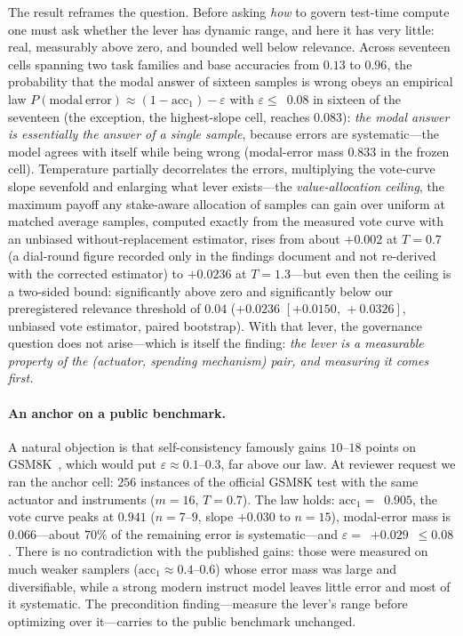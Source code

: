 \documentclass{article}
\newcommand{\LLMtecho}{$+0.0236$} \newcommand{\LLMtechoIC}{$[+0.0150,\,+0.0326]$}
\newcommand{\LLMtechoTbaja}{$+0.002$}
\newcommand{\LLMmodalerr}{$0.833$}
\newcommand{\LLMepsilon}{$0.08$}
\newcommand{\GsmAccUno}{$0.905$} \newcommand{\GsmPend}{$+0.030$}
\newcommand{\GsmModalErr}{$0.066$} \newcommand{\GsmEps}{$+0.029$}
\begin{document}
The result reframes the question. Before asking \emph{how} to govern
test-time compute one must ask whether the lever has dynamic range, and here
it has very little: real, measurably above zero, and bounded well below
relevance. Across seventeen cells spanning two task families and base
accuracies from $0.13$ to $0.96$, the probability that the modal answer of
sixteen samples is wrong obeys an empirical law
$P(\mathrm{modal\ error}) \approx (1-\mathrm{acc}_1) - \varepsilon$ with
$\varepsilon \le$~\LLMepsilon{} in sixteen of the seventeen (the exception,
the highest-slope cell, reaches $0.083$): \emph{the modal answer is
essentially the answer of a single sample}, because errors are systematic---the model agrees
with itself while being wrong (modal-error mass \LLMmodalerr{} in the frozen
cell). Temperature partially decorrelates the errors, multiplying the vote-curve
slope sevenfold and enlarging what lever exists---the
\emph{value-allocation ceiling}, the maximum payoff any stake-aware
allocation of samples can gain over uniform at matched average samples,
computed exactly from the measured vote curve with an unbiased
without-replacement estimator, rises from about \LLMtechoTbaja{} at $T{=}0.7$
(a dial-round figure recorded only in the findings document and not re-derived
with the corrected estimator) to
\LLMtecho{} at $T{=}1.3$---but even then
the ceiling is a two-sided bound: significantly above zero and significantly
below our preregistered relevance threshold of $0.04$
(\LLMtecho{} \LLMtechoIC{}, unbiased vote estimator, paired bootstrap).
With that lever, the governance question does not arise---which is itself
the finding: \emph{the lever is a measurable property of the (actuator,
spending mechanism) pair, and measuring it comes first.}

\paragraph{An anchor on a public benchmark.} A natural objection is
that self-consistency famously gains $10$--$18$ points on
GSM8K~\citep{wang2023selfconsistency}, which would put
$\varepsilon\approx0.1$--$0.3$, far above our law. At reviewer request we
ran the anchor cell: $256$ instances of the official GSM8K test with the
same actuator and instruments ($m{=}16$, $T{=}0.7$). The law holds:
$\mathrm{acc}_1=$~\GsmAccUno, the vote curve peaks at $0.941$ ($n{=}7$--$9$,
slope \GsmPend{} to $n{=}15$), modal-error mass is \GsmModalErr---about
$70\%$ of the remaining error is systematic---and
$\varepsilon=$~\GsmEps~$\le0.08$. There is no contradiction with the
published gains: those were measured on much weaker samplers
($\mathrm{acc}_1\approx0.4$--$0.6$) whose error mass was large and
diversifiable, while a strong modern instruct model leaves little error
and most of it systematic. The precondition finding---measure the
lever's range before optimizing over it---carries to the public
benchmark unchanged.
\end{document}
